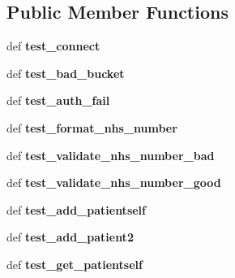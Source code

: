 \subsection*{Public Member Functions}
\begin{DoxyCompactItemize}
\item 
\hypertarget{classtests_1_1all_1_1main__test_a52658a6f5c9860fee1eee9eb6bd276f7}{def {\bfseries test\-\_\-connect}}\label{classtests_1_1all_1_1main__test_a52658a6f5c9860fee1eee9eb6bd276f7}

\item 
\hypertarget{classtests_1_1all_1_1main__test_a81358c42b298ceccfa01e84e40aad061}{def {\bfseries test\-\_\-bad\-\_\-bucket}}\label{classtests_1_1all_1_1main__test_a81358c42b298ceccfa01e84e40aad061}

\item 
\hypertarget{classtests_1_1all_1_1main__test_a3d51827c15fd6f7fffbfc6ade785d64f}{def {\bfseries test\-\_\-auth\-\_\-fail}}\label{classtests_1_1all_1_1main__test_a3d51827c15fd6f7fffbfc6ade785d64f}

\item 
\hypertarget{classtests_1_1all_1_1main__test_a91c8b72555ef67a9349e1e91ed74ccd3}{def {\bfseries test\-\_\-format\-\_\-nhs\-\_\-number}}\label{classtests_1_1all_1_1main__test_a91c8b72555ef67a9349e1e91ed74ccd3}

\item 
\hypertarget{classtests_1_1all_1_1main__test_aefe6fcb2fde732d4ec6afdd460fcd91b}{def {\bfseries test\-\_\-validate\-\_\-nhs\-\_\-number\-\_\-bad}}\label{classtests_1_1all_1_1main__test_aefe6fcb2fde732d4ec6afdd460fcd91b}

\item 
\hypertarget{classtests_1_1all_1_1main__test_ac6a09a4869b4cab663e8716e78e06d3c}{def {\bfseries test\-\_\-validate\-\_\-nhs\-\_\-number\-\_\-good}}\label{classtests_1_1all_1_1main__test_ac6a09a4869b4cab663e8716e78e06d3c}

\item 
\hypertarget{classtests_1_1all_1_1main__test_af5c62265a618165f87b4dc28d153ea7d}{def {\bfseries test\-\_\-add\-\_\-patientself}}\label{classtests_1_1all_1_1main__test_af5c62265a618165f87b4dc28d153ea7d}

\item 
\hypertarget{classtests_1_1all_1_1main__test_a6880211736510e2c82fb0c0f2796e339}{def {\bfseries test\-\_\-add\-\_\-patient2}}\label{classtests_1_1all_1_1main__test_a6880211736510e2c82fb0c0f2796e339}

\item 
\hypertarget{classtests_1_1all_1_1main__test_a9f35cb8ae69eb78360f991e5e3245945}{def {\bfseries test\-\_\-get\-\_\-patientself}}\label{classtests_1_1all_1_1main__test_a9f35cb8ae69eb78360f991e5e3245945}


\end{DoxyCompactItemize}
